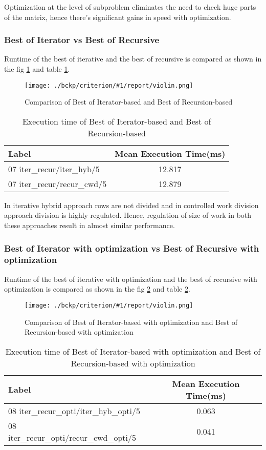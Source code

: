 \documentclass{article}
\newcommand{\loadGraph}[3]{{%
\begin{figure}[!ht]
    \texttt{[image: ./bckp/criterion/\#1/report/violin.png]}
    \caption{#3}
    \label{#2}
\end{figure}}
}%
\begin{document}
Optimization at the level of subproblem eliminates the need to check huge parts of the matrix, hence there's significant gains in speed with optimization.

\subsubsection{Best of Iterator vs Best of Recursive}
Runtime of the best of iterative and the best of recursive is compared as shown in the fig \ref{07_iter_recur} and table \ref{iter_recur}.

\loadGraph{07 iter_recur}{07_iter_recur}{Comparison of Best of Iterator-based and Best of Recursion-based}

\begin{table}[!ht]
\centering
\begin{tabular}{lc}    
\toprule
Label                                & Mean Execution Time(ms) \\ \midrule
07 iter\_recur/iter\_hyb/5  & 12.817                   \\
07 iter\_recur/recur\_cwd/5 & 12.879                   \\ \bottomrule
\end{tabular}
\caption{Execution time of Best of Iterator-based and Best of Recursion-based}
\label{iter_recur}
\end{table}

In iterative hybrid approach rows are not divided and in controlled work division approach division is highly regulated.
Hence, regulation of size of work in both these approaches result in almost similar performance.

\subsubsection{Best of Iterator with optimization vs Best of Recursive with optimization}
Runtime of the best of iterative with optimization and the best of recursive with optimization is compared as shown in the fig \ref{08_iter_recur_opti} and table \ref{iter_recur_opti}.

\loadGraph{08 iter_recur_opti}{08_iter_recur_opti}{Comparison of Best of Iterator-based with optimization and Best of Recursion-based with optimization}

\begin{table}[!ht]
\centering
\begin{tabular}{lc}    
\toprule
Label                                & Mean Execution Time(ms) \\ \midrule
08 iter\_recur\_opti/iter\_hyb\_opti/5  & 0.063                   \\
08 iter\_recur\_opti/recur\_cwd\_opti/5 & 0.041                   \\ \bottomrule
\end{tabular}
\caption{Execution time of Best of Iterator-based with optimization and Best of Recursion-based with optimization}
\label{iter_recur_opti}
\end{table}
\end{document}
